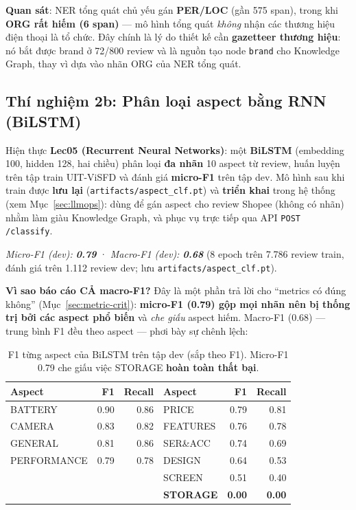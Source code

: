\documentclass[12pt,a4paper]{article}
\begin{document}
\textbf{Quan sát}: NER tổng quát chủ yếu gán \textbf{PER/LOC} (gần 575 span), trong khi \textbf{ORG rất hiếm (6 span)} --- mô hình tổng quát \textit{không} nhận các thương hiệu điện thoại là tổ chức. Đây chính là lý do thiết kế cần \textbf{gazetteer thương hiệu}: nó bắt được brand ở 72/800 review và là nguồn tạo node \texttt{brand} cho Knowledge Graph, thay vì dựa vào nhãn ORG của NER tổng quát.

\subsection{Thí nghiệm 2b: Phân loại aspect bằng RNN (BiLSTM)}
\label{sec:rnn}

Hiện thực \textbf{Lec05 (Recurrent Neural Networks)}: một \textbf{BiLSTM} (embedding 100, hidden 128, hai chiều) phân loại \textbf{đa nhãn} 10 aspect từ review, huấn luyện trên tập train UIT-ViSFD và đánh giá \textbf{micro-F1} trên tập dev. Mô hình sau khi train được \textbf{lưu lại} (\texttt{artifacts/aspect\_clf.pt}) và \textbf{triển khai} trong hệ thống (xem Mục~\ref{sec:llmops}): dùng để gán aspect cho review Shopee (không có nhãn) nhằm làm giàu Knowledge Graph, và phục vụ trực tiếp qua API \texttt{POST /classify}.

\begin{center}
\textit{Micro-F1 (dev): \textbf{0.79}} · \textit{Macro-F1 (dev): \textbf{0.68}} (8 epoch trên 7.786 review train, đánh giá trên 1.112 review dev; lưu \texttt{artifacts/aspect\_clf.pt}).
\end{center}

\noindent\textbf{Vì sao báo cáo CẢ macro-F1?} Đây là một phần trả lời cho ``metrics có đúng không'' (Mục~\ref{sec:metric-crit}): \textbf{micro-F1 (0.79) gộp mọi nhãn nên bị thống trị bởi các aspect phổ biến} và \textit{che giấu} aspect hiếm. Macro-F1 (0.68) --- trung bình F1 đều theo aspect --- phơi bày sự chênh lệch:

\begin{table}[H]
\centering
\caption{F1 từng aspect của BiLSTM trên tập dev (sắp theo F1). Micro-F1 0.79 che giấu việc STORAGE \textbf{hoàn toàn thất bại}.}
\renewcommand{\arraystretch}{1.1}
\begin{tabular}{lrr|lrr}
\toprule
\textbf{Aspect} & \textbf{F1} & \textbf{Recall} & \textbf{Aspect} & \textbf{F1} & \textbf{Recall} \\
\midrule
BATTERY     & 0.90 & 0.86 & PRICE       & 0.79 & 0.81 \\
CAMERA      & 0.83 & 0.82 & FEATURES    & 0.76 & 0.78 \\
GENERAL     & 0.81 & 0.86 & SER\&ACC    & 0.74 & 0.69 \\
PERFORMANCE & 0.79 & 0.78 & DESIGN      & 0.64 & 0.53 \\
            &      &      & SCREEN      & 0.51 & 0.40 \\
            &      &      & \textbf{STORAGE} & \textbf{0.00} & \textbf{0.00} \\
\bottomrule
\end{tabular}
\end{table}
\end{document}
